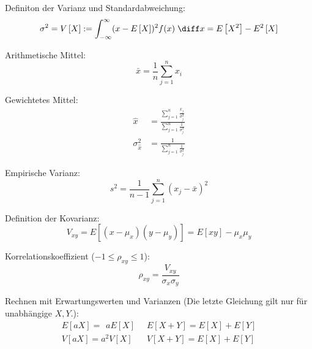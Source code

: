 \documentclass[11pt]{article}
\numberwithin{equation}{section}
\begin{document}
        Definiton der Varianz und Standardabweichung:
        \begin{equation}
          \sigma^2 = V\left[ X \right] := \int_{-\infty}^{\infty} (x-E\left[X\right])^2f(x)\;\diff x = E\left[X^2\right]-E^2\left[X\right]
        \end{equation}

        Arithmetische Mittel:
        \begin{equation}
          \bar{x}=\frac{1}{n}\sum_{j=1}^n x_i
        \end{equation}

        Gewichtetes Mittel:
        \begin{equation}
          \begin{aligned}
            \hat{x} &= \frac{\sum_{j=1}^n \frac{x_j}{\sigma_j^2}}{\sum_{j=1}^n \frac{1}{\sigma_j^2}} \\
            \sigma_{\hat{x}}^2 &= \frac{1}{\sum_{j=1}^n \frac{1}{\sigma_j^2}}
          \end{aligned}
        \end{equation}

        Empirische Varianz:
        \begin{equation}
          s^2 = \frac{1}{n-1}\sum_{j=1}^n (x_j-\bar{x})^2
        \end{equation}

        Definition der Kovarianz:
        \begin{equation}
          V_{xy} = E\left[(x-\mu_x)(y-\mu_y)\right] = E\left[xy\right]-\mu_x\mu_y
        \end{equation}

        Korrelationskoeffizient ($-1\le\rho_{xy}\le 1$):
        \begin{equation}
          \rho_{xy} = \frac{V_{xy}}{\sigma_x\sigma_y}
        \end{equation}

        Rechnen mit Erwartungswerten und Varianzen (Die letzte Gleichung gilt nur für unabhängige $X, Y$.):
        \begin{equation}
  			\begin{array}{rl}
  				E\left[aX\right] = \phantom{^2}a E\left[X\right]
  				&\;\;
          E\left[X+Y\right] = E\left[X\right] + E\left[Y\right]
          \\
          V\left[aX\right] = a^2 V\left[X\right]
          &\;\;
          V\left[X+Y\right] = E\left[X\right] + E\left[Y\right]
          \\
  			\end{array}
  			\end{equation}
\end{document}
